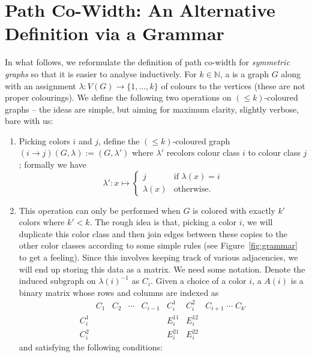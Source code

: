 \section{Path Co-Width: An Alternative Definition via a Grammar}\label{appendix: grammar}
In what follows, we reformulate the definition of path co-width for \textit{symmetric graphs} so that it is easier to analyse inductively.
For $k\in\mathbb{N}$, a  is a graph $G$ along with an assignment $\lambda \colon V(G) \to \{1, \dots, k\}$ of colours to the vertices (these are not proper colourings). We define the following two operations on $(\le k)$-coloured graphs -- the ideas are simple, but aiming for maximum clarity, slightly verbose, bare with us: 
\begin{enumerate}
    \item {} Picking colors $i$ and $j$, define the $(\le k)$-coloured graph $(i \to j)(G, \lambda) := (G, \lambda')$ where $\lambda'$ recolors colour class $i$ to colour class $j$; formally we have
    \[\lambda' \colon x \mapsto \begin{cases} j &\text{if } \lambda(x) = i \\ 
    \lambda(x) &\text{otherwise}.\end{cases}\]
    \item {} This operation can only be performed when $G$ is colored with exactly $k'$ colors where $k' < k$. The rough idea is that, picking a color $i$, we will duplicate this color class and then join edges between these copies to the other color classes according to some simple rules (see Figure~\ref{fig:grammar} to get a feeling). Since this involves keeping track of various adjacencies, we will end up storing this data as a matrix. We need some notation. Denote the induced subgraph on $\lambda(i)^{-1}$ as $C_i$. Given a choice of a color $i$, a  $A(i)$ is a binary matrix whose rows and columns are indexed as 
    \[
        \begin{array}{c|cccc|cc|c}
            & C_1 & C_2 & \cdots & C_{i-1} & C_i^1 & C_i^2 & C_{i+1} \; \cdots \; C_{k'} \\
            \hline
            C_i^1   &  &  &  &  & E_{i}^{11} & E_i^{12} &  \\
            C_i^2  &  &  &  &  & E_i^{21} & E_i^{22} &  
        \end{array}
    \]
    and satisfying the following conditions: 
    \begin{enumerate}

\end{enumerate}
\end{enumerate}
